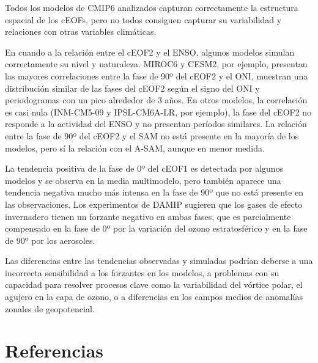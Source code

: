 \documentclass[12pt,oneside,a4paper]{reedthesis}
\begin{document}
Todos los modelos de CMIP6 analizados capturan correctamente la estructura espacial de los cEOFs, pero no todos consiguen capturar su variabilidad y relaciones con otras variables climáticas.

En cuando a la relación entre el cEOF2 y el ENSO, algunos modelos simulan correctamente su nivel y naturaleza.
MIROC6 y CESM2, por ejemplo, presentan las mayores correlaciones entre la fase de 90º del cEOF2 y el ONI, muestran una distribución similar de las fases del cEOF2 según el signo del ONI y periodogramas con un pico alrededor de 3 años.
En otros modelos, la correlación es casi nula (INM-CM5-09 y IPSL-CM6A-LR, por ejemplo), la fase del cEOF2 no responde a la actividad del ENSO y no presentan períodos similares.
La relación entre la fase de 90º del cEOF2 y el SAM no está presente en la mayoría de los modelos, pero sí la relación con el A-SAM, aunque en menor medida.

La tendencia positiva de la fase de 0º del cEOF1 es detectada por algunos modelos y se observa en la media multimodelo, pero también aparece una tendencia negativa mucho más intensa en la fase de 90º que no está presente en las observaciones.
Los experimentos de DAMIP sugieren que los gases de efecto invernadero tienen un forzante negativo en ambas fases, que es parcialmente compensado en la fase de 0º por la variación del ozono estratosférico y en la fase de 90º por los aerosoles.

Las diferencias entre las tendencias observadas y simuladas podrían deberse a una incorrecta sensibilidad a los forzantes en los modelos, a problemas con su capacidad para resolver procesos clave como la variabilidad del vórtice polar, el agujero en la capa de ozono, o a diferencias en los campos medios de anomalías zonales de geopotencial.

\backmatter

\hypertarget{referencias}{%
\chapter*{Referencias}\label{referencias}}


\noindent

\setlength{\parindent}{-0.20in}
\end{document}
